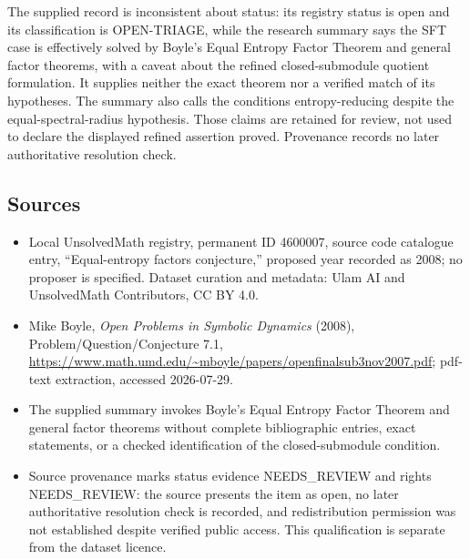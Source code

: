 \documentclass[11pt]{article}
\begin{document}
The supplied record is inconsistent about status: its registry status is open and its classification is OPEN-TRIAGE, while the research summary says the SFT case is effectively solved by Boyle's Equal Entropy Factor Theorem and general factor theorems, with a caveat about the refined closed-submodule quotient formulation. It supplies neither the exact theorem nor a verified match of its hypotheses. The summary also calls the conditions entropy-reducing despite the equal-spectral-radius hypothesis. Those claims are retained for review, not used to declare the displayed refined assertion proved. Provenance records no later authoritative resolution check.
\subsection{Sources}
\begin{itemize}
\item Local UnsolvedMath registry, permanent ID 4600007, source code catalogue entry, ``Equal-entropy factors conjecture,'' proposed year recorded as 2008; no proposer is specified. Dataset curation and metadata: Ulam AI and UnsolvedMath Contributors, CC BY 4.0.
\item Mike Boyle, \emph{Open Problems in Symbolic Dynamics} (2008), Problem/Question/Conjecture 7.1, \url{https://www.math.umd.edu/~mboyle/papers/openfinalsub3nov2007.pdf}; pdf-text extraction, accessed 2026-07-29.
\item The supplied summary invokes Boyle's Equal Entropy Factor Theorem and general factor theorems without complete bibliographic entries, exact statements, or a checked identification of the closed-submodule condition.
\item Source provenance marks status evidence NEEDS\_REVIEW and rights NEEDS\_REVIEW: the source presents the item as open, no later authoritative resolution check is recorded, and redistribution permission was not established despite verified public access. This qualification is separate from the dataset licence.
\end{itemize}
\end{document}
